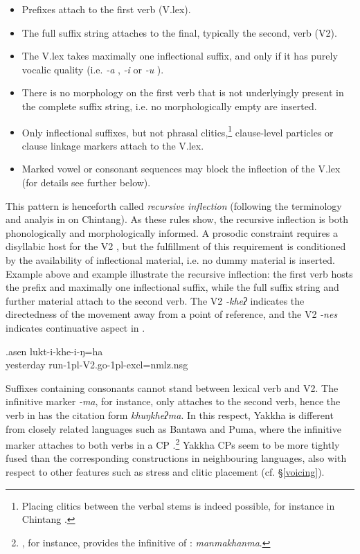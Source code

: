 \begin{itemize}
\item Prefixes attach to the first verb (V.lex).
\item The full suffix string attaches to the final, typically the second, verb (V2).
\item The V.lex takes maximally one inflectional suffix, and only if it has purely vocalic quality (i.e. \emph{-a} , \emph{-i}  or \emph{-u} ).
\item There is no morphology on the first verb that is not underlyingly present in the complete suffix string, i.e. no morphologically empty  are inserted.
\item Only inflectional suffixes, but not phrasal clitics,\footnote{Placing clitics between the verbal stems is indeed possible, for instance in Chintang \citep{Bickeletal2007Free}.} clause-level particles or clause linkage markers attach to the V.lex. 
\item Marked vowel or consonant sequences may block the inflection of the V.lex (for details see further below).
\end{itemize}

This pattern is henceforth called \emph{recursive inflection} (following the terminology and analyis in  \citealt{Bickeletal2007Free} on Chintang). As these rules show, the recursive inflection is both phonologically and morphologically informed. A prosodic constraint  requires a disyllabic host for the V2 , but the fulfillment of this requirement is conditioned by the availability of inflectional material, i.e. no dummy material is inserted. Example \Last above and example  \Next illustrate the recursive inflection: the first verb hosts the prefix and maximally one inflectional suffix, while the full suffix string and further material attach to the second verb. The  V2 \emph{-kheʔ}  indicates the directedness of the movement away from a point of reference, and the V2 \emph{-nes}  indicates continuative aspect in \Last. 

\exg.asen lukt-i-khe-i-ŋ=ha\\
	yesterday run{\sc -1pl-V2.go-1pl-excl=nmlz.nsg}\\
 
Suffixes containing consonants cannot stand between lexical verb and V2. The infinitive marker \emph{-ma}, for instance, only attaches to the second verb, hence the verb in \Last[b] has the citation form \emph{khuŋkheʔma}. In this respect, Yakkha is different from closely related languages  such as Bantawa and Puma, where the infinitive marker attaches to both verbs in a CP \citep{Doornenbal2009A-grammar, Bickeletal2006The-Chintang}.\footnote{\citet[255]{Doornenbal2009A-grammar}, for instance, provides  the infinitive of : \emph{manmakhanma}.} Yakkha CPs seem to be more tightly fused than the corresponding constructions in neighbouring languages, also with respect to other features such as stress and clitic placement (cf. §\ref{voicing}). 

